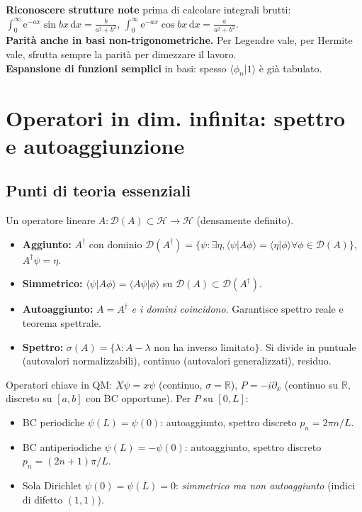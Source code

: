\documentclass[11pt,a4paper,openany]{book}
\theoremstyle{definition}
\newcommand{\R}{\mathbb{R}}
\renewcommand{\H}{\mathcal{H}}
\newcommand{\Dom}{\mathcal{D}}
\newcommand{\braket}[2]{\langle#1|#2\rangle}
\newcommand{\dd}{\mathrm{d}}
\newcommand{\eu}{\mathrm{e}}
\begin{document}
\begin{trucco}
\textbf{Riconoscere strutture note} prima di calcolare integrali brutti: $\int_0^\infty\eu^{-ax}\sin bx\,\dd x=\frac{b}{a^2+b^2}$, $\int_0^\infty\eu^{-ax}\cos bx\,\dd x=\frac{a}{a^2+b^2}$.\\
\textbf{Parit\`a anche in basi non-trigonometriche.} Per Legendre vale, per Hermite vale, sfrutta sempre la parit\`a per dimezzare il lavoro.\\
\textbf{Espansione di funzioni semplici} in basi: spesso $\langle\phi_n|1\rangle$ \`e gi\`a tabulato.
\end{trucco}

\chapter{Operatori in dim. infinita: spettro e autoaggiunzione}\label{ch:operatori}

\section{Punti di teoria essenziali}

\begin{teoria}
Un operatore lineare $A:\Dom(A)\subset\H\to\H$ (densamente definito).
\begin{itemize}
\item \textbf{Aggiunto:} $A^\dagger$ con dominio $\Dom(A^\dagger)=\{\psi:\exists \eta, \braket{\psi}{A\phi}=\braket{\eta}{\phi}\forall\phi\in\Dom(A)\}$, $A^\dagger\psi=\eta$.
\item \textbf{Simmetrico:} $\braket{\psi}{A\phi}=\braket{A\psi}{\phi}$ su $\Dom(A)\subset\Dom(A^\dagger)$.
\item \textbf{Autoaggiunto:} $A=A^\dagger$ \emph{e i domini coincidono}. Garantisce spettro reale e teorema spettrale.
\item \textbf{Spettro:} $\sigma(A)=\{\lambda:A-\lambda$ non ha inverso limitato$\}$. Si divide in puntuale (autovalori normalizzabili), continuo (autovalori generalizzati), residuo.
\end{itemize}
Operatori chiave in QM: $X\psi=x\psi$ (continuo, $\sigma=\R$), $P=-i\partial_x$ (continuo su $\R$, discreto su $[a,b]$ con BC opportune).
Per $P$ su $[0,L]$:
\begin{itemize}
\item BC periodiche $\psi(L)=\psi(0)$: autoaggiunto, spettro discreto $p_n=2\pi n/L$.
\item BC antiperiodiche $\psi(L)=-\psi(0)$: autoaggiunto, spettro discreto $p_n=(2n+1)\pi/L$.
\item Sola Dirichlet $\psi(0)=\psi(L)=0$: \emph{simmetrico ma non autoaggiunto} (indici di difetto $(1,1)$).
\end{itemize}
\end{teoria}
\end{document}
